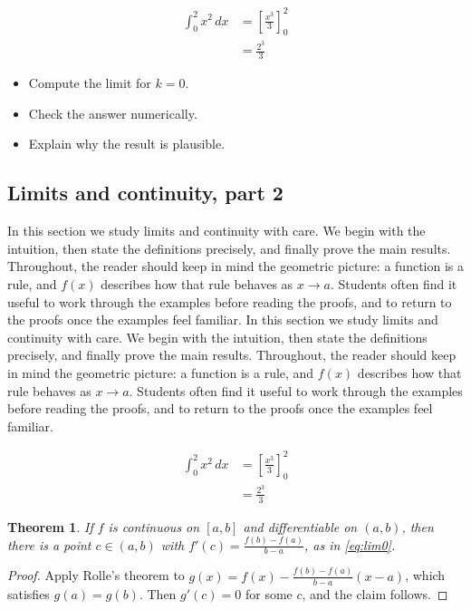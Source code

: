 \documentclass[11pt]{article}
\newtheorem{theorem}{Theorem}[section]
\begin{document}
\begin{align}
  \int_0^{2} x^{2}\,dx &= \left[ \frac{x^{3}}{3} \right]_0^{2} \\
  &= \frac{2^{3}}{3} \label{eq:int0}
\end{align}

\begin{itemize}
  \item Compute the limit for $k = 0$.
  \item Check the answer numerically.
  \item Explain why the result is plausible.
\end{itemize}

\subsection{Limits and continuity, part 2}

In this section we study limits and continuity with care. We begin with the intuition, then state the definitions precisely, and finally prove the main results. Throughout, the reader should keep in mind the geometric picture: a function is a rule, and $f(x)$ describes how that rule behaves as $x \to a$. Students often find it useful to work through the examples before reading the proofs, and to return to the proofs once the examples feel familiar. In this section we study limits and continuity with care. We begin with the intuition, then state the definitions precisely, and finally prove the main results. Throughout, the reader should keep in mind the geometric picture: a function is a rule, and $f(x)$ describes how that rule behaves as $x \to a$. Students often find it useful to work through the examples before reading the proofs, and to return to the proofs once the examples feel familiar. 

\begin{align}
  \int_0^{2} x^{2}\,dx &= \left[ \frac{x^{3}}{3} \right]_0^{2} \\
  &= \frac{2^{3}}{3} \label{eq:int0}
\end{align}

\begin{theorem}
If $f$ is continuous on $[a,b]$ and differentiable on $(a,b)$, then there is a point $c \in (a,b)$ with $f'(c) = \frac{f(b)-f(a)}{b-a}$, as in \eqref{eq:lim0}.
\end{theorem}

\begin{proof}
Apply Rolle's theorem to $g(x) = f(x) - \frac{f(b)-f(a)}{b-a}(x-a)$, which satisfies $g(a) = g(b)$. Then $g'(c) = 0$ for some $c$, and the claim follows.
\end{proof}
\end{document}
